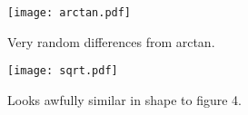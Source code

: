 \documentclass[11pt]{article}
\begin{document}
\begin{figure}[tbp]
    \begin{centering}
    \texttt{[image: arctan.pdf]}
    \caption{Very random differences from arctan.}
    \end{centering}
\end{figure}

\begin{figure}[tbp]
    \begin{centering}
    \texttt{[image: sqrt.pdf]}
    \caption{Looks awfully similar in shape to figure 4.}
    \end{centering}
\end{figure}
\end{document}
